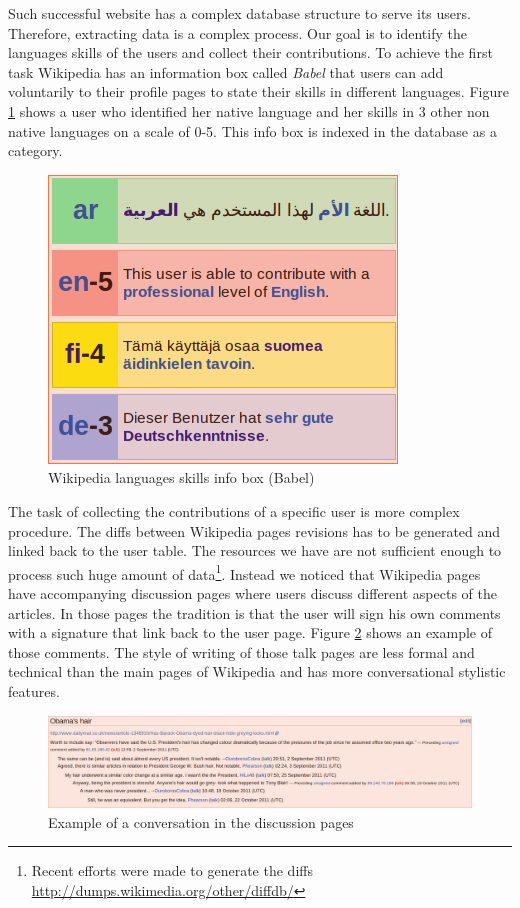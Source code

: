 \documentclass[11pt]{article}
\begin{document}
Such successful website has a complex database structure to serve its users.
Therefore, extracting data is a complex process. Our goal is to identify the
languages skills of the users and collect their contributions. To achieve the
first task Wikipedia has an information box called \emph{Babel} that users can
add voluntarily to their profile pages to state their skills in different
languages. Figure \ref{babel} shows a user who identified her native language
and her skills in 3 other non native languages on a scale of 0-5. This info box
is indexed in the database as a category.

\begin{figure}[htp]
\centering
\includegraphics[scale=0.60]{babel} 
\caption{Wikipedia languages skills info box (Babel)}
\label{babel}
\end{figure}

The task of collecting the contributions of a specific user is more complex
procedure. The diffs between Wikipedia pages revisions has to be generated and
linked back to the user table. The resources we have are not sufficient enough to process such
huge amount of data\footnote{Recent efforts were
made to generate the diffs \url{http://dumps.wikimedia.org/other/diffdb/}}.
Instead we noticed that Wikipedia pages have accompanying discussion pages where
users discuss different aspects of the articles. In those pages the tradition is
that the user will sign his own comments with a signature that link back to the
user page. Figure \ref{obama} shows an example of those comments. The style of writing of those
talk pages are less formal and technical than the main pages of Wikipedia and has more conversational stylistic features.

\begin{figure}[Htp]
\centering
\includegraphics[scale=0.285]{obama.png}
\caption{Example of a conversation in the discussion pages}
\label{obama}
\end{figure}
\end{document}
